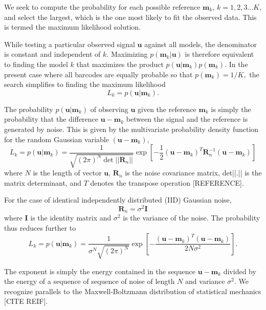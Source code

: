 We seek to compute the probability for each possible reference $\mathbf{m}_k$, $k=1,2,3 \ldots K$, and select the largest, which is the one most likely to fit the observed data. This is termed the maximum likelihood solution.

While testing a particular observed signal $\mathbf{u}$ against all models, the denominator is constant and independent of $k$. Maximizing $p(\mathbf{m}_k|\mathbf{u})$ is therefore equivalent to finding the model $k$ that maximizes the product  $p(\mathbf{u}|\mathbf{m}_k)p(\mathbf{m}_k)$.
In the present case where all barcodes are equally probable so that
$p(\mathbf{m}_k)=1/K,$ 
the search simplifies to finding the maximum likelihood 
\begin{equation}
L_k = p(\mathbf{u}|\mathbf{m}_k).
\end{equation}



The probability $p(\mathbf{u}|\mathbf{m}_k)$ of observing $\mathbf{u}$ given the reference $\mathbf{m}_k$ is simply the probability that the difference $\mathbf{u}-\mathbf{m}_k$ between the signal and the reference is generated by noise. This is given by the multivariate probability density function for the random Gaussian variable $(\mathbf{u}-\mathbf{m}_k)$, 
\begin{equation}\label{eq:Main}
L_k = p(\mathbf{u}|\mathbf{m}_k) = \frac{1}{  \sqrt{ (2\pi)^N \det || \mathbf{R}_n||} } \exp\left[ -\frac{1}{2}  (\mathbf{u}-\mathbf{m}_k)^T \mathbf{R}_n^{-1} (\mathbf{u}-\mathbf{m}_k) \right]
\end{equation}
where $N$ is the length of vector $\mathbf{u}$, $\mathbf{R}_n$ is the noise covariance matrix, det||.|| is the matrix determinant, and $T$ denotes the transpose operation [REFERENCE].
 
For the case of identical independently distributed (IID) Gaussian noise, 
\begin{equation}
\mathbf{R}_n=\sigma^2 \mathbf{I}
\end{equation}
where $\mathbf{I}$ is the identity matrix and $\sigma^2$ is the variance of the noise. The probability thus reduces further to
\begin{equation}\label{eq:iidEnergy}
L_k = p(\mathbf{u}|\mathbf{m}_k) = \frac{1}{  \sigma^N \sqrt{ (2\pi)^N}   } \exp\left[ -\frac{(\mathbf{u}-\mathbf{m}_k)^T(\mathbf{u}-\mathbf{m}_k)} {2 N \sigma^2 } \right].
\end{equation}

The exponent is simply the energy contained in the sequence $\mathbf{u}-\mathbf{m}_k$ divided by the
energy of a sequence of sequence of noise of length $N$ and variance $\sigma^2$. We recognize parallels to the Maxwell-Boltzmann distribution of statistical mechanics [CITE REIF].  

